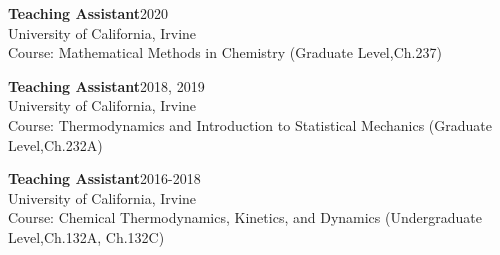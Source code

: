 \documentclass[letterpaper]{article}
\renewenvironment{itemize}{
  \begin{list}{}{
    \setlength{\leftmargin}{1.5em}
  }
}{
  \end{list}
}
\begin{document}
\begin{itemize}
\item \textbf{Teaching Assistant}\hfill 2020\\
      University of California, Irvine\\
		  Course: Mathematical Methods in Chemistry
      (Graduate Level,Ch.237)
\item \textbf{Teaching Assistant}\hfill 2018, 2019\\
      University of California, Irvine\\
		  Course: Thermodynamics and Introduction to Statistical Mechanics
      (Graduate Level,Ch.232A)


\item \textbf{Teaching Assistant}\hfill 2016-2018\\
      University of California, Irvine\\
		  Course: Chemical Thermodynamics, Kinetics, and Dynamics
      (Undergraduate Level,Ch.132A, Ch.132C)



\end{itemize}
\end{document}
